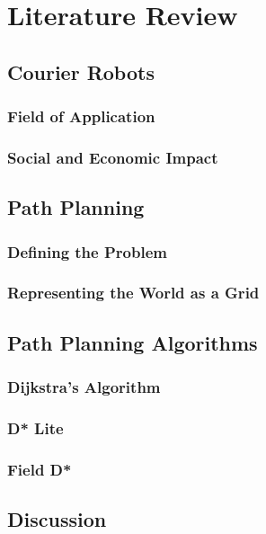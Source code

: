 \chapter{Literature Review}


\section{Courier Robots}

\subsection{Field of Application}

\subsection{Social and Economic Impact}


\section{Path Planning}

\subsection{Defining the Problem}

\subsection{Representing the World as a Grid}


\section{Path Planning Algorithms}

\subsection{Dijkstra's Algorithm}

\subsection{D* Lite}

\subsection{Field D*}


\section{Discussion}



